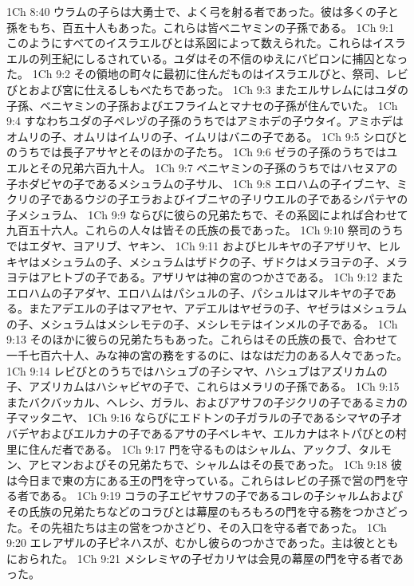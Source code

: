 1Ch 8:40  ウラムの子らは大勇士で、よく弓を射る者であった。彼は多くの子と孫をもち、百五十人もあった。これらは皆ベニヤミンの子孫である。
1Ch 9:1  このようにすべてのイスラエルびとは系図によって数えられた。これらはイスラエルの列王紀にしるされている。ユダはその不信のゆえにバビロンに捕囚となった。
1Ch 9:2  その領地の町々に最初に住んだものはイスラエルびと、祭司、レビびとおよび宮に仕えるしもべたちであった。
1Ch 9:3  またエルサレムにはユダの子孫、ベニヤミンの子孫およびエフライムとマナセの子孫が住んでいた。
1Ch 9:4  すなわちユダの子ペレヅの子孫のうちではアミホデの子ウタイ。アミホデはオムリの子、オムリはイムリの子、イムリはバニの子である。
1Ch 9:5  シロびとのうちでは長子アサヤとそのほかの子たち。
1Ch 9:6  ゼラの子孫のうちではユエルとその兄弟六百九十人。
1Ch 9:7  ベニヤミンの子孫のうちではハセヌアの子ホダビヤの子であるメシュラムの子サル、
1Ch 9:8  エロハムの子イブニヤ、ミクリの子であるウジの子エラおよびイブニヤの子リウエルの子であるシパテヤの子メシュラム、
1Ch 9:9  ならびに彼らの兄弟たちで、その系図によれば合わせて九百五十六人。これらの人々は皆その氏族の長であった。
1Ch 9:10  祭司のうちではエダヤ、ヨアリブ、ヤキン、
1Ch 9:11  およびヒルキヤの子アザリヤ、ヒルキヤはメシュラムの子、メシュラムはザドクの子、ザドクはメラヨテの子、メラヨテはアヒトブの子である。アザリヤは神の宮のつかさである。
1Ch 9:12  またエロハムの子アダヤ、エロハムはパシュルの子、パシュルはマルキヤの子である。またアデエルの子はマアセヤ、アデエルはヤゼラの子、ヤゼラはメシュラムの子、メシュラムはメシレモテの子、メシレモテはインメルの子である。
1Ch 9:13  そのほかに彼らの兄弟たちもあった。これらはその氏族の長で、合わせて一千七百六十人、みな神の宮の務をするのに、はなはだ力のある人々であった。
1Ch 9:14  レビびとのうちではハシュブの子シマヤ、ハシュブはアズリカムの子、アズリカムはハシャビヤの子で、これらはメラリの子孫である。
1Ch 9:15  またバクバッカル、ヘレシ、ガラル、およびアサフの子ジクリの子であるミカの子マッタニヤ、
1Ch 9:16  ならびにエドトンの子ガラルの子であるシマヤの子オバデヤおよびエルカナの子であるアサの子ベレキヤ、エルカナはネトパびとの村里に住んだ者である。
1Ch 9:17  門を守るものはシャルム、アックブ、タルモン、アヒマンおよびその兄弟たちで、シャルムはその長であった。
1Ch 9:18  彼は今日まで東の方にある王の門を守っている。これらはレビの子孫で営の門を守る者である。
1Ch 9:19  コラの子エビヤサフの子であるコレの子シャルムおよびその氏族の兄弟たちなどのコラびとは幕屋のもろもろの門を守る務をつかさどった。その先祖たちは主の営をつかさどり、その入口を守る者であった。
1Ch 9:20  エレアザルの子ピネハスが、むかし彼らのつかさであった。主は彼とともにおられた。
1Ch 9:21  メシレミヤの子ゼカリヤは会見の幕屋の門を守る者であった。

